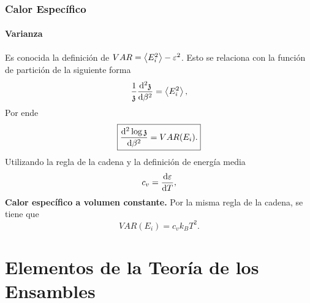 \subsection{Calor Específico}
\subsubsection{Varianza}
Es conocida la definición de $VAR = \expval{E_i ^2} - \varepsilon ^2$. Esto se relaciona con la función de partición de la siguiente forma
    $$ \frac{1}{\mathfrak{z}} \dv[2]{\mathfrak{z}}{\beta} = \expval{E_i ^2}, $$
Por ende
    $$ \boxed{ \dv[2]{\log{\mathfrak{z}}}{\beta} = VAR (E_i). } $$
Utilizando la regla de la cadena y la definición de energía media
    $$ c_v = \dv{\varepsilon}{T}, $$
\textbf{Calor específico a volumen constante.} Por la misma regla de la cadena, se tiene que
    $$ VAR (E_i) = c_v k_B T^2. $$



\chapter{Elementos de la Teoría de los Ensambles}
